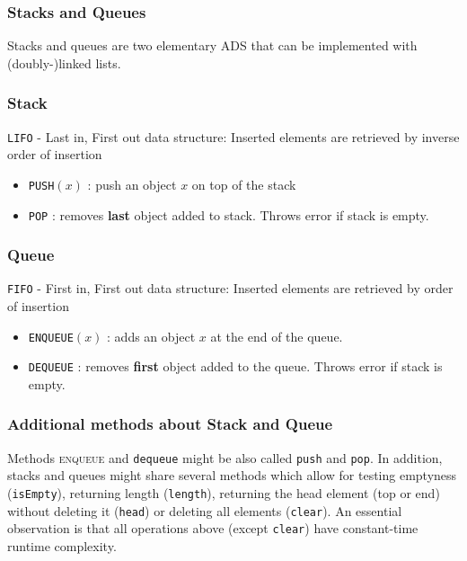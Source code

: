 \documentclass[a4paper]{article}
\begin{document}
\subsubsection{Stacks and Queues}
Stacks and queues are two elementary ADS that can be implemented with (doubly-)linked lists.

\subsubsection*{Stack}
\texttt{LIFO} - Last in, First out data structure: Inserted elements are retrieved by inverse order of insertion
    \begin{itemize}
        \item \texttt{PUSH}$(x)$ : push an object $x$ on top of the stack
        \item \texttt{POP} : removes \textbf{last} object added to stack. Throws error if stack is empty.
    \end{itemize}
    
\subsubsection*{Queue}
\texttt{FIFO} - First in, First out data structure: Inserted elements are retrieved by order of insertion
    \begin{itemize}
        \item \texttt{ENQUEUE}$(x)$ : adds an object $x$ at the end of the queue.
        \item \texttt{DEQUEUE} : removes \textbf{first} object added to the queue. Throws error if stack is empty.
    \end{itemize}

\subsubsection*{Additional methods about Stack and Queue}

Methods \textsc{enqueue} and \texttt{dequeue} might be also called \texttt{push} and \texttt{pop}. In addition, stacks and queues might share several methods which allow for testing emptyness (\texttt{isEmpty}), returning length (\texttt{length}), returning the head element (top or end) without deleting it (\texttt{head})  or deleting all elements (\texttt{clear}).
An essential observation is that all operations above (except \texttt{clear}) have constant-time runtime complexity.
\end{document}
